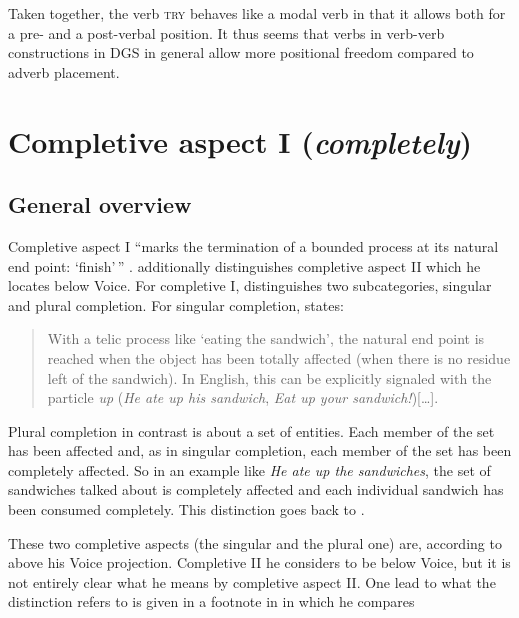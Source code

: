 \noindent Taken together, the verb \textsc{try} behaves like a modal verb in that it allows both for a pre- and a post-verbal position. It thus seems that verbs in verb-verb constructions in DGS in general allow more positional freedom compared to adverb placement.


\section{Completive aspect I (\textit{completely})}\label{completiveone}
\subsection{General overview}
Completive aspect I ``marks the termination of a bounded process at its natural end point: `finish'\,'' \citep[70]{cinque2006restructuring}. \citet[100--104]{cinque1999adverbs} additionally distinguishes completive aspect II which he locates below Voice. For completive I, \citet{cinque1999adverbs} distinguishes two subcategories, singular and plural completion. For singular completion, \citet[100]{cinque1999adverbs} states:

\begin{quote}
With a telic process like `eating the sandwich', the natural end point is reached when the object has been totally affected (when there is no residue left of the sandwich). In English, this can be explicitly signaled with the particle \textit{up} (\textit{He ate up his sandwich}, \textit{Eat up your sandwich!})[\dots ].
\end{quote}

\noindent Plural completion in contrast is about a set of entities. Each member of the set has been affected and, as in singular completion, each member of the set has been completely affected. So in an example like \textit{He ate up the sandwiches}, the set of sandwiches talked about is completely affected and each individual sandwich has been consumed completely. This distinction goes back to \citet[57--69]{bybee1994evolution}. 

These two completive aspects (the singular and the plural one) are, according to \citet{cinque1999adverbs} above his Voice projection. Completive II he considers to be below Voice, but it is not entirely clear what he means by completive aspect II. One lead to what the distinction refers to is given in a footnote in \citet[178]{cinque1999adverbs} in which he compares

